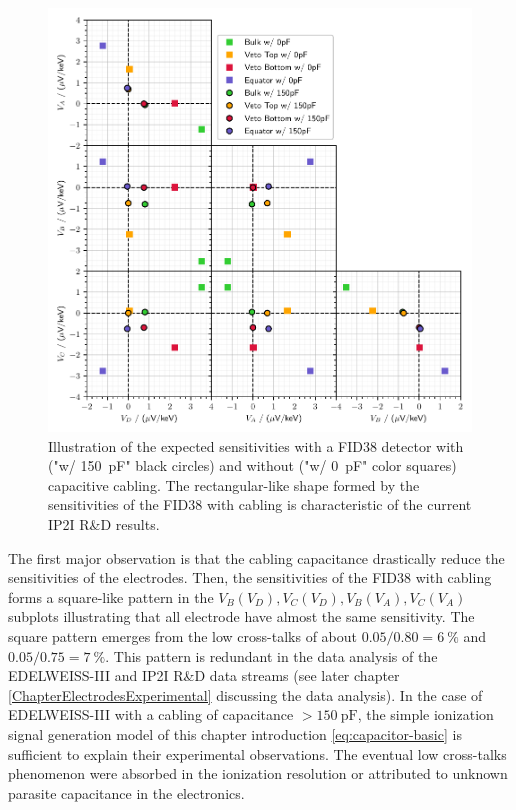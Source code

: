 \begin{figure}
\centering
\includegraphics[width=\linewidth]{Figures/Electrodes/pl38_predictive_sensitivity.pdf}
\caption{Illustration of the expected sensitivities with a FID38 detector with ("w/ \SI{150}{\pico\farad}" black circles) and without ("w/ \SI{0}{\pico\farad}" color squares) capacitive cabling. The rectangular-like shape formed by the sensitivities of the FID38 with cabling is characteristic of the current IP2I R\&D results.}
\label{fig:predict-corner-plot}
\end{figure}

The first major observation is that the cabling capacitance drastically reduce the sensitivities of the electrodes. Then, the sensitivities of the FID38 with cabling forms a square-like pattern in the $V_B(V_D), V_C(V_D), V_B(V_A), V_C(V_A)$ subplots illustrating that all electrode have almost the same sensitivity.  The square pattern emerges from the low cross-talks of about $0.05/0.80=\SI{6}{\percent}$ and $0.05/0.75=\SI{7}{\percent}$. This pattern is redundant in the data analysis of the EDELWEISS-III and IP2I R\&D data streams (see later chapter \ref{ChapterElectrodesExperimental} discussing the data analysis). 
In the case of EDELWEISS-III with a cabling of capacitance $>\SI{150}{\pico\farad}$, the simple ionization signal generation model of this chapter introduction \ref{eq:capacitor-basic} is sufficient to explain their experimental observations. The eventual low cross-talks phenomenon were absorbed in the ionization resolution or attributed to unknown parasite capacitance in the electronics.

